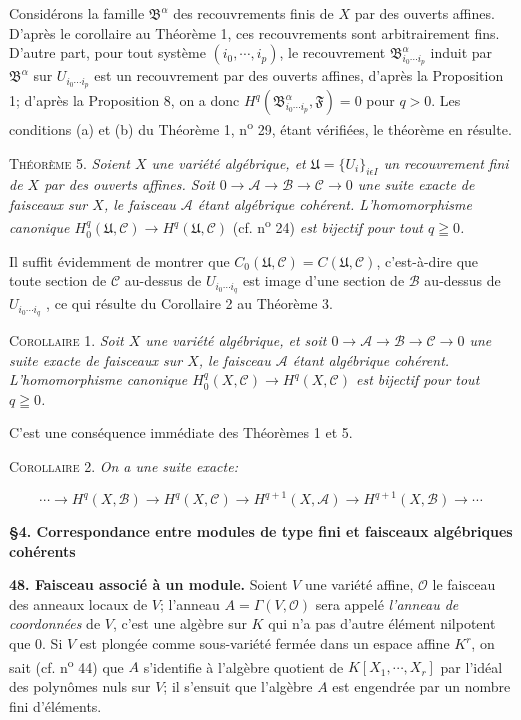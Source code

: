 Considérons la famille $\mathfrak{B}^\alpha$ des recouvrements finis de $X$ par des ouverts affines. D'après le corollaire au Théorème 1, ces recouvrements sont arbitrairement fins. D'autre part, pour tout système $(i_0 , \cdots , i_p)$, le recouvrement $\mathfrak{B}^\alpha_{i_0 \cdots i_p}$ induit par $\mathfrak{B}^\alpha$ sur $U_{i_0 \cdots i_p}$ est un recouvrement par des ouverts affines, d'après la Proposition 1; d'après la Proposition 8, on a donc $H^q(\mathfrak{B}^\alpha_{i_0 \cdots i_p} , \mathfrak{F}) = 0$ pour $q > 0$. Les conditions (a) et (b) du Théorème 1, n\textsuperscript{o} 29, étant vérifiées, le théorème en résulte.

\textsc{Théorème} 5. \textit{Soient $X$ une variété algébrique, et $\mathfrak{U} = \{U_i\}_{i \epsilon I}$ un recouvrement}
\textit{fini de $X$ par des ouverts affines. Soit $0 \to \mathcal{A} \to \mathcal{B} \to \mathcal{C} \to 0$ une suite exacte de faisceaux sur $X$, le faisceau $\mathcal{A}$ étant algébrique cohérent. L'homomorphisme canonique $H^q_0(\mathfrak{U}, \mathcal{C}) \to H^q(\mathfrak{U}, \mathcal{C})$} (cf. n\textsuperscript{o} 24) \textit{est bijectif pour tout $q \geqq 0$.}

Il suffit évidemment de montrer que $C_0(\mathfrak{U}, \mathcal{C}) = C(\mathfrak{U}, \mathcal{C})$, c'est-à-dire que toute section de $\mathcal{C}$ au-dessus de $U_{i_0 \cdots i_q}$ est image d'une section de $\mathcal{B}$ au-dessus de $U_{i_0 \cdots i_q}$ , ce qui résulte du Corollaire 2 au Théorème 3.

\textsc{Corollaire} 1. \textit{Soit $X$ une variété algébrique, et soit $0 \to \mathcal{A} \to \mathcal{B} \to \mathcal{C} \to 0$ une suite exacte de faisceaux sur $X$, le faisceau $\mathcal{A}$ étant algébrique cohérent. L'homomorphisme canonique $H^q_0(X, \mathcal{C}) \to H^q(X, \mathcal{C})$ est bijectif pour tout $q \geqq 0$.}

C'est une conséquence immédiate des Théorèmes 1 et 5.

\textsc{Corollaire} 2. \textit{On a une suite exacte:}

\begin{equation*}
\cdots \to H^q(X, \mathcal{B}) \to H^q(X, \mathcal{C}) \to H^{q+1}(X, \mathcal{A}) \to H^{q+1}(X, \mathcal{B}) \to \cdots
\end{equation*}

\textbf{§4. Correspondance entre modules de type fini et faisceaux algébriques cohérents}

\textbf{48. Faisceau associé à un module.} Soient $V$ une variété affine, $\mathcal{O}$ le faisceau des anneaux locaux de $V$; l'anneau $A = \Gamma(V, \mathcal{O})$ sera appelé \textit{l'anneau de coordonnées} de $V$, c'est une algèbre sur $K$ qui n'a pas d'autre élément nilpotent que 0. Si $V$ est plongée comme sous-variété fermée dans un espace affine $K^r$, on sait (cf. n\textsuperscript{o} 44) que $A$ s'identifie à l'algèbre quotient de $K[X_1 , \cdots , X_r]$ par l'idéal des polynômes nuls sur $V$; il s'ensuit que l'algèbre $A$ est engendrée par un nombre fini d'éléments.

